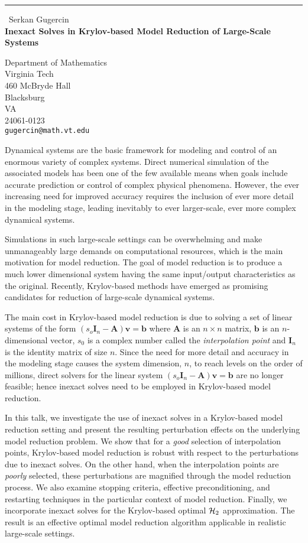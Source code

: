 \documentclass{report}
\begin{document}
\begin{center}
\rule{6in}{1pt} \
{\large Serkan Gugercin \\
{\bf Inexact Solves in Krylov-based Model Reduction of Large-Scale Systems}}

Department of Mathematics \\ Virginia Tech \\ 460 McBryde Hall \\ Blacksburg \\ VA \\ 24061-0123
\\
{\tt gugercin@math.vt.edu}\end{center}

Dynamical systems are the basic framework for modeling and control
of an enormous variety of complex systems. Direct numerical simulation of
the associated models
has been one of the few available means when goals include accurate prediction
or control of complex physical phenomena. However, the ever
increasing need for improved accuracy requires the inclusion of ever
more detail in the modeling stage, leading inevitably to ever
larger-scale, ever more complex dynamical systems.

Simulations in such large-scale settings can be overwhelming and
make unmanageably large demands on computational resources, which is
the main motivation for model reduction. The goal of model reduction is
to produce a much lower dimensional system having the same
input/output characteristics as the original. Recently, Krylov-based methods have emerged
as promising candidates for reduction of large-scale dynamical systems.


The main cost in Krylov-based model reduction is due to solving
a set of linear systems of the form $(s_o \mathbf{I}_n - \mathbf{A})
\mathbf{v} = \mathbf{b}$
where $\mathbf{A}$ is an ${n \times n}$ matrix, $\mathbf{b}$ is an $n$-dimensional
vector, $s_0$ is a complex number called the {\it interpolation point} and $\mathbf{I}_n$
is the identity matrix of size $n$.
Since the need for more detail and
accuracy in the modeling stage causes the system dimension, $n$,
to reach levels on the order of millions, direct solvers for
the linear system $(s_o \mathbf{I}_n - \mathbf{A}) \mathbf{v} = \mathbf{b}$ are no longer
feasible; hence inexact solves need to be employed in Krylov-based model
reduction.

In this talk, we investigate the use of inexact solves in a Krylov-based
model reduction setting
and present the resulting perturbation effects on the underlying model reduction problem.
We show that for a \emph{good} selection of interpolation points,
Krylov-based model reduction is robust
with respect to the perturbations due to inexact solves. On the other
hand, when the interpolation points are
\emph{poorly} selected, these perturbations are magnified through the
model reduction process.
We also examine stopping criteria, effective preconditioning, and restarting techniques
in the particular context of model reduction. Finally, we incorporate
inexact solves for the Krylov-based optimal ${\cal H}_2$ approximation. The result is
an effective optimal model reduction algorithm applicable in realistic
large-scale settings.
\end{document}
